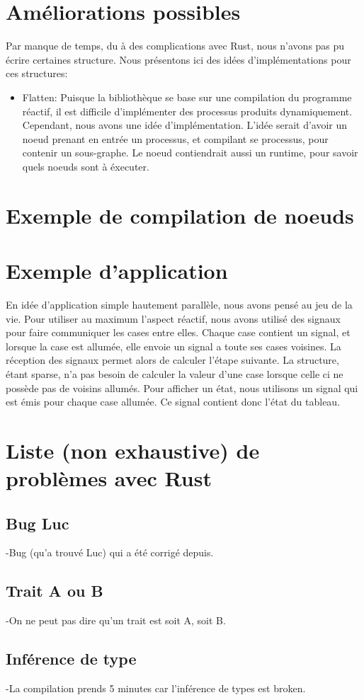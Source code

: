 \documentclass[a4paper]{article}
\renewcommand{\(}{\left(}
\renewcommand{\)}{\right)}
\begin{document}
\section{Améliorations possibles}

Par manque de temps, du à des complications avec Rust, nous n'avons pas pu
écrire certaines structure. Nous présentons ici des idées d'implémentations pour
ces structures:

\begin{itemize}
\item Flatten: Puisque la bibliothèque se base sur une compilation du programme
  réactif, il est difficile d'implémenter des processus produits dynamiquement.
  Cependant, nous avons une idée d'implémentation. L'idée serait d'avoir un
  noeud prenant en entrée un processus, et compilant se processus, pour contenir
  un sous-graphe. Le noeud contiendrait aussi un runtime, pour savoir quels
  noeuds sont à éxecuter.
\end{itemize}

\section{Exemple de compilation de noeuds}


\section{Exemple d'application}

En idée d'application simple hautement parallèle, nous avons pensé au jeu de la
vie. Pour utiliser au maximum l'aspect réactif, nous avons utilisé des signaux
pour faire communiquer les cases entre elles. Chaque case contient un signal, et
lorsque la case est allumée, elle envoie un signal a toute ses cases voisines.
La réception des signaux permet alors de calculer l'étape suivante. La
structure, étant sparse, n'a pas besoin de calculer la valeur d'une case lorsque
celle ci ne possède pas de voisins allumés. Pour afficher un état, nous
utilisons un signal qui est émis pour chaque case allumée. Ce signal contient
donc l'état du tableau.

\section{Liste (non exhaustive) de problèmes avec Rust}
\subsection{Bug Luc}
-Bug (qu'a trouvé Luc) qui a été corrigé depuis.

\subsection{Trait A ou B}
-On ne peut pas dire qu'un trait est soit A, soit B.

\subsection{Inférence de type}
-La compilation prends 5 minutes car l'inférence de types est broken.
\end{document}
